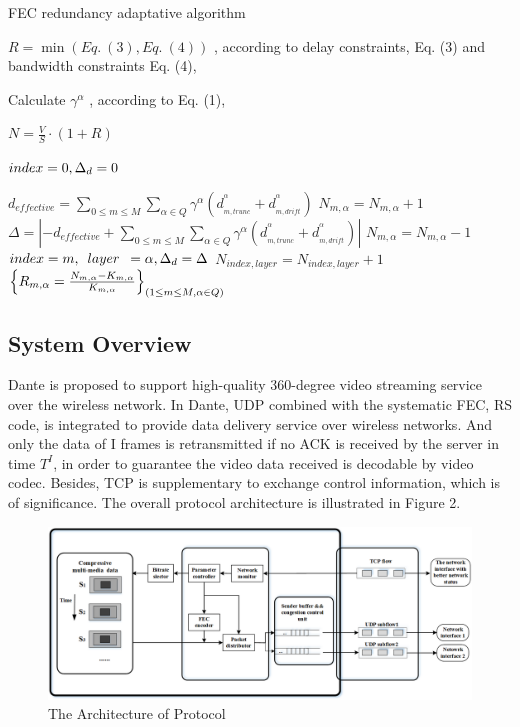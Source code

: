 \begin{algorithm}[!h] 
	\scriptsize
	\centering 
	\caption{FEC redundancy adaptative algorithm}%
	\begin{algorithmic}[1]%
		\STATE $R = \min (Eq.~(3), Eq.~(4))$ , according to delay constraints, Eq. (3) and
		bandwidth constraints Eq. (4),
		
		\STATE Calculate $\gamma ^\alpha$ , according to Eq. (1),
		
		\ENDFOR
		
		\STATE $N = \frac{V}{S} \cdot (1+R)$ 
		
		\STATE $index{\rm{ }} = {\rm{ }}0,{\rm{ }}{\Delta _d}{\rm{ }} = 0$
		
		\STATE ${d_{effective}} = \sum\limits_{0 \le m \le M} {\sum\limits_{\alpha 
				\in Q} {{\gamma ^\alpha }(d_{_{m,trunc}}^{^\alpha } + d_{_{m,drift}}^{^\alpha
				})} } $
		\STATE ${N_{m,\alpha }} = {N_{m,\alpha }} + 1$
		\STATE $\Delta  = \left| { - {d_{effective}} + \sum\limits_{0 \le m \le M}
			{\sum\limits_{\alpha  \in Q} {{\gamma ^\alpha }(d_{_{m,trunc}}^{^\alpha } +
					d_{_{m,drift}}^{^\alpha })} } } \right|$
		\STATE ${N_{m,\alpha }} = {N_{m,\alpha }} - 1$
		\STATE $index{\rm{ }} = m,\begin{array}{*{20}{c}}
		{layer}
		\end{array} = \alpha ,{\Delta _d} = \Delta$
		\ENDIF
		\ENDFOR 
		\ENDFOR
		\STATE ${N_{index, layer }} = {N_{index, layer }} + 1$
		\ENDFOR
		\RETURN${\left\{ {{R_{m,\alpha }} = \frac{{{N_{m,\alpha }}{\rm{ - }}{K_{m,\alpha }}}}{{{K_{m,\alpha }}}}} \right\}_{(1 \le m \le M,\alpha  \in Q)}}$
	\end{algorithmic}  
\end{algorithm} 




\subsection{System Overview}

Dante is proposed to support high-quality 360-degree video
streaming service over the wireless network. In Dante, UDP combined with the systematic FEC, RS code, is integrated to provide data delivery service over wireless networks. And only the data of I frames is retransmitted if no ACK is received by the server in time ${T^I}$, in order to guarantee the video data received is decodable by video codec.
Besides, TCP is supplementary to exchange control information, which is of significance. The overall protocol architecture is illustrated in Figure 2.

\begin{figure}[ht]
	\centering
	\includegraphics[scale=0.4]{paper_figs/architecture_V2.png}
	\caption{The Architecture of Protocol}
	\label{paper_figs:pathdemo}
\end{figure}
